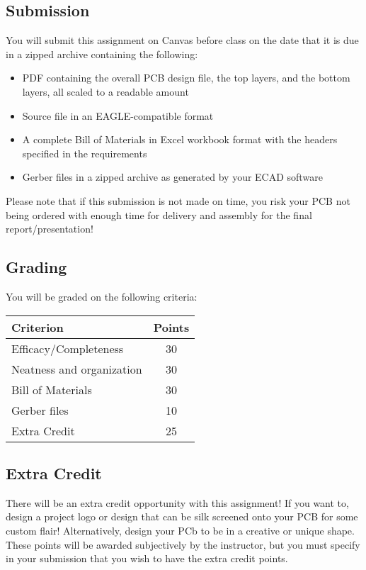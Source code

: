     \subsection*{Submission}
    You will submit this assignment on Canvas before class on the date that it is due in a zipped archive containing the following:

    \begin{itemize}
        \item PDF containing the overall PCB design file, the top layers, and the bottom layers, all scaled to a readable amount
        \item Source file in an EAGLE-compatible format
        \item A complete Bill of Materials in Excel workbook format with the headers specified in the requirements
        \item Gerber files in a zipped archive as generated by your ECAD software
    \end{itemize}

    Please note that if this submission is not made on time, you risk your PCB not being ordered with enough time for delivery and assembly for the final report/presentation!

    \subsection*{Grading}
    You will be graded on the following criteria:

    \begin{table}[h!]
        \begin{tabular}{l | c}
            \toprule
            Criterion & Points \\

            \midrule
            Efficacy/Completeness & 30 \\
            Neatness and organization & 30 \\
            Bill of Materials & 30 \\
            Gerber files & 10 \\
            Extra Credit & 25 \\
            \bottomrule
        \end{tabular}
    \end{table}
    
    \subsection*{Extra Credit}
    There will be an extra credit opportunity with this assignment!
    If you want to, design a project logo or design that can be silk screened onto your PCB for some custom flair!
    Alternatively, design your PCb to be in a creative or unique shape.
    These points will be awarded subjectively by the instructor, but you must specify in your submission that you wish to have the extra credit points.

